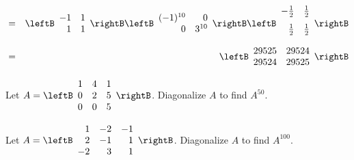 \begin{enumialphparenastyle}
\begin{ex}
\begin{sol}
\begin{eqnarray*}
&=& 
\leftB
\begin{array}{rr}
-1 & 1 \\
1 & 1 
\end{array}
\rightB 
\leftB
\begin{array}{rr}
(-1)^{10} & 0 \\
0 & 3^{10} 
\end{array}
\rightB
\leftB
\begin{array}{rr}
-\vspace{0.05in}\frac{1}{2} & \vspace{0.05in}\frac{1}{2} \\
\vspace{0.05in}\frac{1}{2} & \vspace{0.05in}\frac{1}{2} 
\end{array}
\rightB \\
&=&
\leftB
\begin{array}{rr}
29525 & 29524 \\
29524 & 29525 
\end{array}
\rightB
\end{eqnarray*}
\end{sol}
\end{ex}

\begin{ex} Let $A = \leftB \begin{array}{rrr}
1 & 4 & 1 \\
0 & 2 & 5 \\
0 & 0 & 5 
\end{array} \rightB$. Diagonalize $A$ to find $A^{50}$. 
\end{ex}

\begin{ex} Let $A = \leftB \begin{array}{rrr}
1 & -2 & -1 \\
2 & -1 & 1 \\
-2 & 3 & 1 
\end{array} \rightB$. Diagonalize $A$ to find $A^{100}$. 
\end{ex}

\end{enumialphparenastyle}